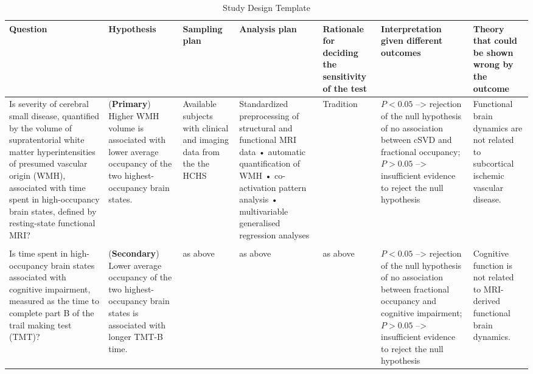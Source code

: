 \renewcommand\cellset{\renewcommand\arraystretch{0.5}%
    \setlength\extrarowheight{0pt}}
\begin{table}[bt]
    \scriptsize
    \begin{fullwidth}
        \begin{threeparttable}
            \begin{spacing}{0.8}\centering
                \begin{tabularx}{1.3\textwidth}{p{.17\linewidth} p{.13\linewidth} p{.09\linewidth} p{.15\linewidth} p{.09\linewidth} p{.14\linewidth} p{.08\linewidth}}
                    \toprule
                    Question   & Hypothesis     & Sampling plan     & Analysis plan   & Rationale for deciding the sensitivity of the test & Interpretation given different outcomes & Theory that could be shown wrong by the outcome \\
                    \midrule
                    Is severity of cerebral small disease, quantified by the volume of supratentorial white matter hyperintensities of presumed vascular origin (WMH), associated with time spent in high-occupancy brain states, defined by resting-state functional MRI? & 
                    (\textbf{Primary}) Higher WMH volume is associated with lower average occupancy of the two highest-occupancy brain states. & 
                    Available subjects with clinical and imaging data from the the HCHS \citep{Jagodzinski2020-lx} & 
                    Standardized preprocessing of structural and functional MRI data • automatic quantification of WMH • co-activation pattern analysis • multivariable generalised regression analyses &
                    Tradition &
                    \makecell[tp{\linewidth}]{$P<0.05$ --> rejection of the null hypothesis of no association between cSVD and fractional occupancy;\\ $P>0.05$ --> insufficient evidence to reject the null hypothesis}    &
                    Functional brain dynamics are not related to subcortical ischemic vascular disease.    \\
                    \hline \\
                    Is time spent in high-occupancy brain states associated with cognitive impairment, measured as the time to complete part B of the trail making test (TMT)? & (\textbf{Secondary}) Lower average occupancy of the two highest-occupancy brain states is associated with longer TMT-B time. & as above & as above & as above &  \makecell[tp{\linewidth}]{$P<0.05$ --> rejection of the null hypothesis of no association between fractional occupancy and cognitive impairment;\\ $P>0.05$ --> insufficient evidence to reject the null hypothesis} &   Cognitive function is not related to MRI-derived functional brain dynamics.\\
                    \bottomrule
                \end{tabularx}
            \end{spacing}
            \bigskip
            \caption{Study Design Template}
            \label{tab:SDT}
        \end{threeparttable}
    \end{fullwidth}
\end{table}